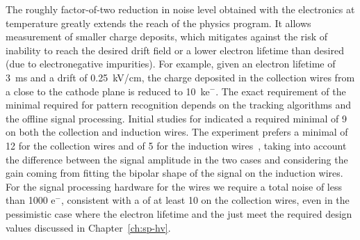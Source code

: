 The roughly factor-of-two reduction in noise level obtained with the  electronics at  temperature greatly 
extends the reach of the  physics program. %
It allows measurement of smaller charge deposits, which mitigates against the risk of %
inability to reach the desired drift field %
or %
a lower electron lifetime %
than desired (due to %
electronegative impurities). %
For example, given an electron lifetime of \SI{3}{ms} and a drift \efield
of \SI{0.25}{kV/cm}, the charge deposited in the collection wires from a 
 close to the cathode plane is reduced to \SI{10}{k}{e$^-$}.
The exact requirement of the minimal  required for pattern
recognition depends on the tracking algorithms and %
the offline signal processing.
Initial studies for  indicated %
a required minimal  of \num{9} 
on both the collection and induction wires. %
The 
 experiment prefers a minimal  of \num{12} for the
collection wires and of \num{5} for the induction wires~\cite{bib:sbnddoc1921}, taking into account
the difference between the signal amplitude in the two cases and considering %
the gain coming from fitting the bipolar shape of the signal on the
induction wires. 
For the signal processing hardware for the  wires we require 
a total noise of less than 1000 e$^-$, consistent with a 
of at least 10 on the collection wires, 
even in the pessimistic case  where the electron lifetime and the \efield just meet the required design values discussed in Chapter~\ref{ch:sp-hv}.

